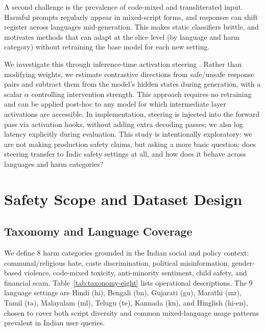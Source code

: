 \documentclass[11pt]{article}
\begin{document}
A second challenge is the prevalence of code-mixed and transliterated input. Harmful prompts regularly appear in mixed-script forms, and responses can shift register across languages mid-generation. This makes static classifiers brittle, and motivates methods that can adapt at the slice level (by language and harm category) without retraining the base model for each new setting.

We investigate this through inference-time activation steering \citep{turner2024steeringlanguagemodelsactivation,zou2025representationengineeringtopdownapproach,pokharel2026crosslingualactivationsteeringmultilingual,banerjee2025soterialanguagespecificfunctionalparameter}. Rather than modifying weights, we estimate contrastive directions from safe/unsafe response pairs and subtract them from the model's hidden states during generation, with a scalar $\alpha$ controlling intervention strength. This approach requires no retraining and can be applied post-hoc to any model for which intermediate layer activations are accessible. In implementation, steering is injected into the forward pass via activation hooks, without adding extra decoding passes; we also log latency explicitly during evaluation. This study is intentionally exploratory: we are not making production safety claims, but asking a more basic question: does steering transfer to Indic safety settings at all, and how does it behave across languages and harm categories? 

\section{Safety Scope and Dataset Design}

\subsection{Taxonomy and Language Coverage}

We define 8 harm categories grounded in the Indian social and policy context: communal/religious hate, caste discrimination, political misinformation, gender-based violence, code-mixed toxicity, anti-minority sentiment, child safety, and financial scam. Table~\ref{tab:taxonomy-eight} lists operational descriptions. The 9 language settings are Hindi (hi), Bengali (bn), Gujarati (gu), Marathi (mr), Tamil (ta), Malayalam (ml), Telugu (te), Kannada (kn), and Hinglish (hi-en), chosen to cover both script diversity and common mixed-language usage patterns prevalent in Indian user queries.
\end{document}
